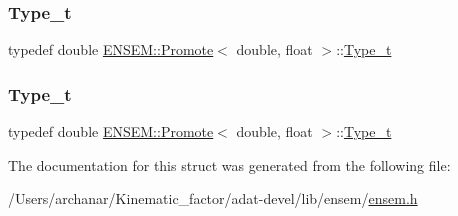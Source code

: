 \mbox{\label{structENSEM_1_1Promote_3_01double_00_01float_01_4_a28b4d03d3f730b8dcd68ae2c895ea119}} 
\subsubsection{\texorpdfstring{Type\_t}{Type\_t}\hspace{0.1cm}{\footnotesize\ttfamily [2/3]}}
{\footnotesize\ttfamily typedef double \mbox{\hyperlink{structENSEM_1_1Promote}{E\+N\+S\+E\+M\+::\+Promote}}$<$ double, float $>$\+::\mbox{\hyperlink{structENSEM_1_1Promote_3_01double_00_01float_01_4_a28b4d03d3f730b8dcd68ae2c895ea119}{Type\+\_\+t}}}

\mbox{\label{structENSEM_1_1Promote_3_01double_00_01float_01_4_a28b4d03d3f730b8dcd68ae2c895ea119}} 
\subsubsection{\texorpdfstring{Type\_t}{Type\_t}\hspace{0.1cm}{\footnotesize\ttfamily [3/3]}}
{\footnotesize\ttfamily typedef double \mbox{\hyperlink{structENSEM_1_1Promote}{E\+N\+S\+E\+M\+::\+Promote}}$<$ double, float $>$\+::\mbox{\hyperlink{structENSEM_1_1Promote_3_01double_00_01float_01_4_a28b4d03d3f730b8dcd68ae2c895ea119}{Type\+\_\+t}}}



The documentation for this struct was generated from the following file\+:\begin{DoxyCompactItemize}
\item 
/\+Users/archanar/\+Kinematic\+\_\+factor/adat-\/devel/lib/ensem/\mbox{\hyperlink{adat-devel_2lib_2ensem_2ensem_8h}{ensem.\+h}}\end{DoxyCompactItemize}
